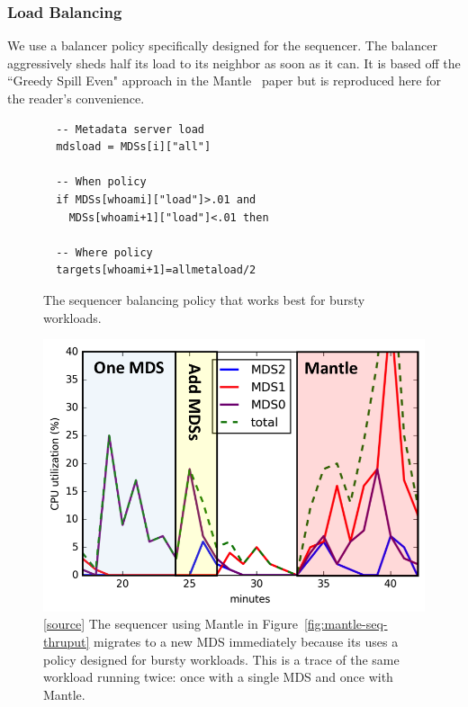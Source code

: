 \documentclass[preprint]{sigplanconf-eurosys}
\begin{document}
\subsubsection{Load Balancing}

We use a balancer policy specifically designed for the sequencer. The balancer
aggressively sheds half its load to its neighbor as soon as it can.  It is
based off the ``Greedy Spill Even" approach in the
Mantle~\cite{sevilla:sc15-mantle} paper but is reproduced here for the reader's
convenience. 

\begin{figure}[]
\begin{lstlisting}
  -- Metadata server load
  mdsload = MDSs[i]["all"]
  
  -- When policy
  if MDSs[whoami]["load"]>.01 and 
    MDSs[whoami+1]["load"]<.01 then
    
  -- Where policy
  targets[whoami+1]=allmetaload/2
\end{lstlisting}
\caption{The sequencer balancing policy that works best for bursty workloads.
\label{listing:greedy-spill}}
\end{figure}

\begin{figure}[t!]
\centering
\includegraphics{figures/mantle-cpu-utilization-annotate.png}
\caption{[\href{https://github.com/double-blind-submitter/osdi16}{source}] The
sequencer using Mantle in Figure~\ref{fig:mantle-seq-thruput} migrates to a new
MDS immediately because its uses a policy designed for bursty workloads. This
is a trace of the same workload running twice: once with a single MDS and once
with Mantle.}
\label{fig:mantle-cpu-utilization}
\end{figure}
\end{document}
